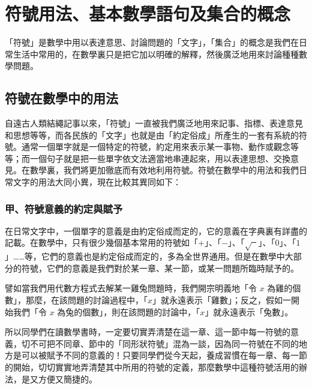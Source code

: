 
\section{符號用法、基本數學語句及集合的概念}\label{sec:ch2}

「符號」是數學中用以表達意思、討論問題的「文字」，「集合」的概念是我們在日常生活中常用的，在數學裏只是把它加以明確的解釋，然後廣泛地用來討論種種數學問題。

\subsection{符號在數學中的用法}\label{sec:2-1}

自遠古人類結繩記事以來，「符號」一直被我們廣泛地用來記事、指標、表達意見和思想等等，而各民族的「文字」也就是由「約定俗成」所產生的一套有系統的符號。通常一個單字就是一個特定的符號，約定用來表示某一事物、動作或觀念等等；而一個句子就是把一些單字依文法適當地串連起來，用以表達思想、交換意見。在數學裏，我們將更加徹底而有效地利用符號。符號在數學中的用法和我們日常文字的用法大同小異，現在比較其異同如下：

\subsubsection*{甲、符號意義的約定與賦予}\label{subsec:2-1-a}

在日常文字中，一個單字的意義是由約定俗成而定的，它的意義在字典裏有詳盡的記載。在數學中，只有很少幾個基本常用的符號如「$+$」、「$-$」、「$\sqrt{\phantom{x}}$」、「$0$」、「$1$」……等，它們的意義也是約定俗成而定的，多為全世界通用。但是在數學中大部分的符號，它們的意義是我們對於某一章、某一節，或某一問題所臨時賦予的。

譬如當我們用代數方程式去解某一雞兔問題時，我們開宗明義地「令 $x$ 為雞的個數」，那麼，在該問題的討論過程中，「$x$」就永遠表示「雞數」；反之，假如一開始我們「令 $x$ 為兔的個數」，則在該問題的討論中，「$x$」就永遠表示「兔數」。

所以同學們在讀數學書時，一定要切實弄清楚在這一章、這一節中每一符號的意義，切不可把不同章、節中的「同形狀符號」混為一談，因為同一符號在不同的地方是可以被賦予不同的意義的！只要同學們從今天起，養成習慣在每一章、每一節的開始，切切實實地弄清楚其中所用的符號的定義，那麼數學中這種符號活用的辦法，是又方便又簡捷的。

